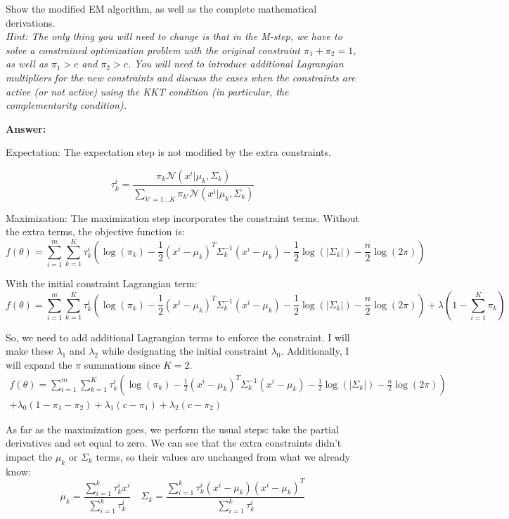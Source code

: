 \documentclass[12pt]{article}
\begin{document}
Show the modified EM algorithm, as well as the complete mathematical derivations. \\

\textit{\small Hint: The only thing you will need to change is that in the M-step, we have to solve a constrained optimization problem with the original constraint $\pi_1+\pi_2 = 1$, as well as $\pi_1 > c$ and $\pi_2 > c$. You will need to introduce additional Lagrangian multipliers for the new constraints and discuss the cases when the constraints are active (or not active) using the KKT condition (in particular, the complementarity condition).}

{\bf Answer:}

Expectation: The expectation step is not modified by the extra constraints.

\[
    \tau_k^i = \frac{\pi_k \mathcal{N}(x^i | \mu_k,\Sigma_k)}{\sum_{k'=1...K}\pi_{k'}\mathcal{N}(x^i | \mu_k,\Sigma_k)}
\]

Maximization: The maximization step incorporates the constraint terms. Without the extra terms, the objective function is:
\[
    f(\theta) = \sum_{i=1}^m \sum_{k=1}^K \tau_k^i(\log(\pi_k) - \frac{1}{2}(x^i-\mu_k)^T \Sigma_k^{-1}(x^i-\mu_k)-\frac{1}{2}\log(|\Sigma_k|)-\frac{n}{2}\log(2\pi))
\]

With the initial constraint Lagrangian term:
\[
    f(\theta) = \sum_{i=1}^m \sum_{k=1}^K \tau_k^i(\log(\pi_k) - \frac{1}{2}(x^i-\mu_k)^T \Sigma_k^{-1}(x^i-\mu_k)-\frac{1}{2}\log(|\Sigma_k|)-\frac{n}{2}\log(2\pi)) + \lambda(1-\sum_{i=1}^K \pi_k)
\]

So, we need to add additional Lagrangian terms to enforce the constraint. I will make these $\lambda_1$ and $\lambda_2$ while designating the initial constraint $\lambda_0$. Additionally, I will expand the $\pi$ summations since $K=2$.
\begin{align*}
    f(\theta) = \sum_{i=1}^m \sum_{k=1}^K \tau_k^i(\log(\pi_k) - \frac{1}{2}(x^i-\mu_k)^T \Sigma_k^{-1}(x^i-\mu_k)-\frac{1}{2}\log(|\Sigma_k|)-\frac{n}{2}\log(2\pi)) \\+ \lambda_0(1 - \pi_1 - \pi_2 ) + \lambda_1(c-\pi_1) + \lambda_2(c-\pi_2)
\end{align*}

As far as the maximization goes, we perform the usual steps: take the partial derivatives and set equal to zero. We can see that the extra constraints didn't impact the $\mu_k$ or $\Sigma_k$ terms, so their values are unchanged from what we already know:
\[
    \mu_k=\frac{\sum_{i=1}^k \tau_k^i x^i}{\sum_{i=1}^k \tau_k^i} \quad
    \Sigma_k=\frac{\sum_{i=1}^k \tau_k^i(x^i-\mu_k)(x^i-\mu_k)^T}{\sum_{i=1}^k \tau_k^i}
\]
\end{document}
